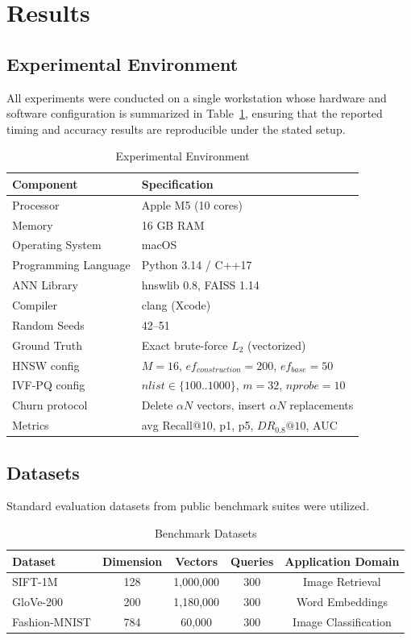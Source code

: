 \documentclass{ieeeaccess}
\begin{document}
\section{Results}
\label{sec:results}
\label{sec:experiment}
\subsection{Experimental Environment}
All experiments were conducted on a single workstation whose hardware and software configuration is summarized in Table~\ref{tab:environment}, ensuring that the reported timing and accuracy results are reproducible under the stated setup.
\begin{table}[t]
\centering
\caption{Experimental Environment}
\label{tab:environment}
\begin{tabular}{ll}
\toprule
Component & Specification \\
\midrule
Processor & Apple M5 (10 cores) \\
Memory & 16 GB RAM \\
Operating System & macOS \\
Programming Language & Python 3.14 / C++17 \\
ANN Library & hnswlib 0.8, FAISS 1.14 \\
Compiler & clang (Xcode) \\
Random Seeds & 42--51 \\
\midrule
Ground Truth & Exact brute-force $L_2$ (vectorized) \\
HNSW config & $M=16$, $ef_{construction}=200$, $ef_{base}=50$ \\
IVF-PQ config & $nlist \in \{100..1000\}$, $m=32$, $nprobe=10$ \\
\midrule
Churn protocol & Delete $\alpha N$ vectors, insert $\alpha N$ replacements \\
Metrics & avg Recall@10, p1, p5, $DR_{0.8}@10$, AUC \\
\bottomrule
\end{tabular}
\end{table}

\subsection{Datasets}
Standard evaluation datasets from public benchmark suites \cite{ANNBenchmarks2020, ANNBenchmarks2022, Aumuller2020_46, Simhadri2023, Simhadri2024} were utilized.

\begin{table}[t]
\centering
\caption{Benchmark Datasets}
\label{tab:datasets}
\begin{tabular}{lcccc}
\toprule
Dataset & Dimension & Vectors & Queries & Application Domain \\
\midrule
SIFT-1M & 128 & 1,000,000 & 300 & Image Retrieval \cite{ANNBenchmarks2020, ANNBenchmarks2022} \\
GloVe-200 & 200 & 1,180,000 & 300 & Word Embeddings \cite{ANNBenchmarks2020} \\
Fashion-MNIST & 784 & 60,000 & 300 & Image Classification \cite{ANNBenchmarks2020, Aumuller2020_46} \\
\bottomrule
\end{tabular}
\end{table}
\end{document}
